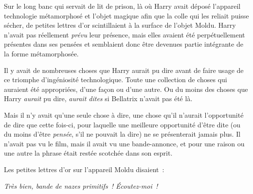 Sur le long banc qui servait de lit de prison, là où Harry avait déposé l'appareil technologie métamorphosé et l'objet magique afin que la colle qui les reliait puisse sécher, de petites lettres d'or scintillaient à la surface de l'objet Moldu. Harry n'avait pas réellement \emph{prévu} leur présence, mais elles avaient été perpétuellement présentes dans ses pensées et semblaient donc être devenues partie intégrante de la forme métamorphosée.

Il y avait de nombreuses choses que Harry aurait pu dire avant de faire usage de ce triomphe d'ingéniosité technologique. Toute une collection de choses qui auraient été appropriées, d'une façon ou d'une autre. Ou du moins des choses que Harry \emph{aurait} pu dire, \emph{aurait dites} si Bellatrix n'avait pas été là.

Mais il n'y avait qu'une seule chose à dire, une chose qu'il n'aurait l'opportunité de dire que cette fois-ci, pour laquelle une meilleure opportunité d'être dite (ou du moins d'être \emph{pensée}, s'il ne pouvait la dire) ne se présenterait jamais plus. Il n'avait pas vu le film, mais il avait vu une bande-annonce, et pour une raison ou une autre la phrase était restée scotchée dans son esprit.

Les petites lettres d'or sur l'appareil Moldu disaient~:

\emph{Très bien, bande de nazes primitifs~! Écoutez-moi~!}

